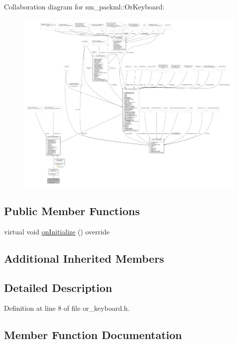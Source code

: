 Collaboration diagram for sm\+\_\+packml\+:\+:Or\+Keyboard\+:
\nopagebreak
\begin{figure}[H]
\begin{center}
\leavevmode
\includegraphics[width=350pt]{classsm__packml_1_1OrKeyboard__coll__graph}
\end{center}
\end{figure}
\subsection*{Public Member Functions}
\begin{DoxyCompactItemize}
\item 
virtual void \hyperlink{classsm__packml_1_1OrKeyboard_ab0a1a2d5686330dc75a1c203009ded0a}{on\+Initialize} () override
\end{DoxyCompactItemize}
\subsection*{Additional Inherited Members}


\subsection{Detailed Description}


Definition at line 8 of file or\+\_\+keyboard.\+h.



\subsection{Member Function Documentation}
\mbox{\label{classsm__packml_1_1OrKeyboard_ab0a1a2d5686330dc75a1c203009ded0a}} 
